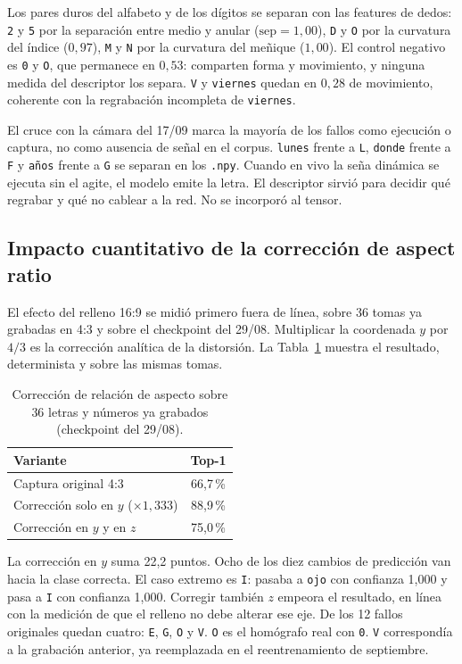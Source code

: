Los pares duros del alfabeto y de los dígitos se separan con las features de dedos: \texttt{2} y \texttt{5} por la separación entre medio y anular ($\mathrm{sep} = 1{,}00$), \texttt{D} y \texttt{O} por la curvatura del índice ($0{,}97$), \texttt{M} y \texttt{N} por la curvatura del meñique ($1{,}00$). El control negativo es \texttt{0} y \texttt{O}, que permanece en $0{,}53$: comparten forma y movimiento, y ninguna medida del descriptor los separa. \texttt{V} y \texttt{viernes} quedan en $0{,}28$ de movimiento, coherente con la regrabación incompleta de \texttt{viernes}.

El cruce con la cámara del 17/09 marca la mayoría de los fallos como ejecución o captura, no como ausencia de señal en el corpus. \texttt{lunes} frente a \texttt{L}, \texttt{donde} frente a \texttt{F} y \texttt{años} frente a \texttt{G} se separan en los \texttt{.npy}. Cuando en vivo la seña dinámica se ejecuta sin el agite, el modelo emite la letra. El descriptor sirvió para decidir qué regrabar y qué no cablear a la red. No se incorporó al tensor.

\subsection{Impacto cuantitativo de la corrección de aspect ratio}

El efecto del relleno 16:9 se midió primero fuera de línea, sobre 36 tomas ya grabadas en 4:3 y sobre el checkpoint del 29/08. Multiplicar la coordenada $y$ por $4/3$ es la corrección analítica de la distorsión. La Tabla~\ref{tab:aspect} muestra el resultado, determinista y sobre las mismas tomas.

\begin{table}[H]
    \centering
    \small
    \caption{Corrección de relación de aspecto sobre 36 letras y números ya grabados (checkpoint del 29/08).}
    \label{tab:aspect}
    \begin{tabular}{lc}
        \toprule
        \textbf{Variante} & \textbf{Top-1} \\
        \midrule
        Captura original 4:3 & 66{,}7\,\% \\
        Corrección solo en $y$ ($\times 1{,}333$) & 88{,}9\,\% \\
        Corrección en $y$ y en $z$ & 75{,}0\,\% \\
        \bottomrule
    \end{tabular}
\end{table}

La corrección en $y$ suma 22{,}2 puntos. Ocho de los diez cambios de predicción van hacia la clase correcta. El caso extremo es \texttt{I}: pasaba a \texttt{ojo} con confianza 1{,}000 y pasa a \texttt{I} con confianza 1{,}000. Corregir también $z$ empeora el resultado, en línea con la medición de que el relleno no debe alterar ese eje. De los 12 fallos originales quedan cuatro: \texttt{E}, \texttt{G}, \texttt{O} y \texttt{V}. \texttt{O} es el homógrafo real con \texttt{0}. \texttt{V} correspondía a la grabación anterior, ya reemplazada en el reentrenamiento de septiembre.

